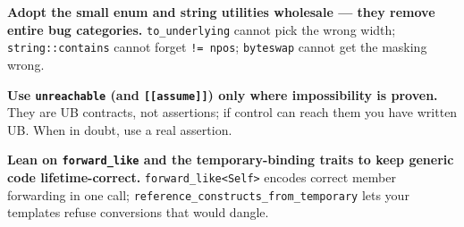 \textbf{Adopt the small enum and string utilities wholesale --- they remove entire bug categories.} \lstinline|to_underlying| cannot pick the wrong width; \lstinline|string::contains| cannot forget \lstinline|!= npos|; \lstinline|byteswap| cannot get the masking wrong.

\textbf{Use \lstinline|unreachable| (and \lstinline|[[assume]]|) only where impossibility is proven.} They are UB contracts, not assertions; if control can reach them you have written UB. When in doubt, use a real assertion.

\textbf{Lean on \lstinline|forward_like| and the temporary-binding traits to keep generic code lifetime-correct.} \lstinline|forward_like<Self>| encodes correct member forwarding in one call; \lstinline|reference_constructs_from_temporary| lets your templates refuse conversions that would dangle.
